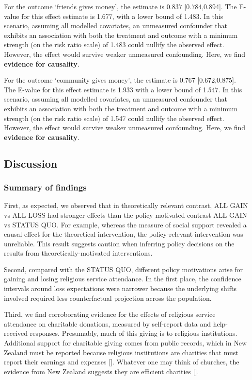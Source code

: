 \documentclass[
  single column]{article}
\begin{document}
For the outcome `friends gives money', the estimate is 0.837
{[}0.784,0.894{]}. The E-value for this effect estimate is 1.677, with a
lower bound of 1.483. In this scenario, assuming all modelled
covariates, an unmeasured confounder that exhibits an association with
both the treatment and outcome with a minimum strength (on the risk
ratio scale) of 1.483 could nullify the observed effect. However, the
effect would survive weaker unmeasured confounding. Here, we find
\textbf{evidence for causality}.

For the outcome `community gives money', the estimate is 0.767
{[}0.672,0.875{]}. The E-value for this effect estimate is 1.933 with a
lower bound of 1.547. In this scenario, assuming all modelled
covariates, an unmeasured confounder that exhibits an association with
both the treatment and outcome with a minimum strength (on the risk
ratio scale) of 1.547 could nullify the observed effect. However, the
effect would survive weaker unmeasured confounding. Here, we find
\textbf{evidence for causality}.

\subsection{Discussion}\label{discussion}

\subsubsection{Summary of findings}\label{summary-of-findings}

First, as expected, we observed that in theoretically relevant contrast,
ALL GAIN vs ALL LOSS had stronger effects than the policy-motivated
contrast ALL GAIN vs STATUS QUO. For example, whereas the measure of
social support revealed a causal effect for the theoretical
intervention, the policy-relevant intervention was unreliable. This
result suggests caution when inferring policy decisions on the results
from theoretically-motivated interventions.

Second, compared with the STATUS QUO, different policy motivations arise
for gaining and losing religious service attendance. In the first place,
the confidence intervals around loss expectations were narrower because
the underlying shifts involved required less counterfactual projection
across the population.

Third, we find corroborating evidence for the effects of religious
service attendance on charitable donations, measured by self-report data
and help-received responses. Presumably, much of this giving is to
religious institutions. Additional support for charitable giving comes
from public records, which in New Zealand must be reported because
religious institutions are charities that must report their earnings and
expenses {[}{]}. Whatever one may think of churches, the evidence from
New Zealand suggests they are efficient charities {[}{]}.
\end{document}

